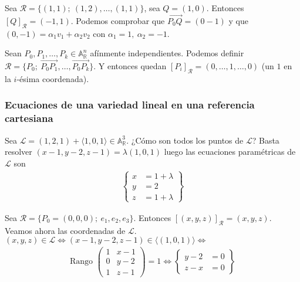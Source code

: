 \documentclass[14pt]{book}
\begin{document}
\begin{ej}
	Sea $\mathcal{R} = \{(1,1);\ (1,2), \dots, (1,1)\}$, sea $Q = (1, 0)$. Entonces $[Q]_\mathcal{R} = (-1, 1)$. Podemos comprobar que $\overrightarrow{P_0 Q} = (0 -1)$ y que $(0, -1) = \alpha_1 v_1 + \alpha_2 v_2$ con $\alpha_1 = 1,\ \alpha_2 = -1$.
	
	Sean $P_0, P_1, \dots, P_k \in \mathbb{A}_\mathbb{R}^n$ afínmente independientes. Podemos definir $\mathcal{R} = \{P_0;\ \overrightarrow{P_0 P_1}, \dots, \overrightarrow{P_0 P_k}\}$. Y entonces quedan $[P_i]_\mathcal{R} = (0, \dots, 1, \dots, 0)$ (un $1$ en la $i$-ésima coordenada).
\end{ej}

\subsubsection{Ecuaciones de una variedad lineal en una referencia cartesiana} 

\begin{ej}
	Sea $\mathcal{L} = (1,2,1) + \langle 1, 0, 1 \rangle \in \mathbb{A}^3_\mathbb{R}$. ¿Cómo son todos los puntos de $\mathcal{L}$? Basta resolver $(x - 1, y - 2, z - 1) = \lambda (1,0,1)$ luego las ecuaciones paramétricas de $\mathcal{L}$ son
	\begin{align*}
		\left\lbrace\begin{array}{cc}
		x &= 1 + \lambda \\
		y &= 2 \\
		z &= 1 + \lambda
		\end{array}\right\rbrace
	\end{align*}
	
	Sea $\mathcal{R} = \{P_0 = (0,0,0);\ e_1, e_2, e_3\}$. Entonces $[(x,y,z)]_\mathcal{R} = (x, y, z)$. Veamos ahora las coordenadas de $\mathcal{L}$. $(x, y, z) \in \mathcal{L} \iff (x - 1, y - 2, z - 1) \in \langle(1, 0, 1) \rangle \iff$
	\begin{align*}
		\text{Rango }\left(\begin{array}{cc}
		1 & x - 1 \\
		0 & y - 2 \\
		1 & z - 1
		\end{array}\right) = 1 \iff
		\left\lbrace \begin{array}{cc}
			y - 2 &= 0 \\
			z - x &= 0
		\end{array}\right\rbrace
	\end{align*}
\end{ej}
\end{document}
